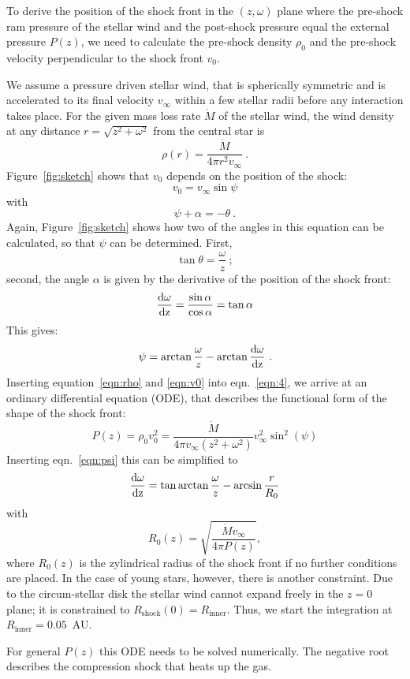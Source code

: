 To derive the position of the shock front in the $(z, \omega)$ plane where the pre-shock ram pressure of the stellar wind and the post-shock pressure equal the external pressure $P(z)$, we need to calculate the pre-shock density $\rho_0$ and the pre-shock velocity perpendicular to the shock front $v_0$.

We assume a pressure driven stellar wind, that is spherically symmetric and is accelerated to its final velocity $v_{\infty}$ within a few stellar radii before any interaction takes place. For the given mass loss rate $\dot M$ of the stellar wind, the wind density at any distance $r=\sqrt{z^2+\omega^2}$ from the central star is 
\begin{equation}\label{eqn:rho}
\rho(r) = \frac{\dot M}{4 \pi r^2 v_{\infty}}\ .
\end{equation}
Figure~\ref{fig:sketch} shows that $v_0$ depends on the position of the shock:
\begin{equation}
\label{eqn:v0}v_0 = v_{\infty} \sin \psi
\end{equation}
with 
\begin{equation}\label{eqn:angle}
\psi+\alpha = - \theta \ .
\end{equation}
Again, Figure~\ref{fig:sketch} shows how two of the angles in this equation can be calculated, so that $\psi$ can be determined. First,
\begin{equation}\label{eqn:theta}
\tan\theta = \frac{\omega}{z}\ ;
\end{equation}
second, the angle $\alpha$ is given by the derivative of the position of the shock front:
\begin{equation}\label{eqn:deriv}
\frac{\rm{d}\omega}{\rm{d}z} = \frac{\sin \alpha}{\cos \alpha} = \tan{\alpha}
\end{equation}
This gives:
\begin{equation}\label{eqn:psi}
\psi = \arctan{\frac{\omega}{z}} - \arctan{\frac{\rm{d}\omega}{\rm{d}z}}\ .
\end{equation}
Inserting equation~\ref{eqn:rho} and \ref{eqn:v0} into eqn.~\ref{eqn:4}, we arrive at an ordinary differential equation (ODE), that describes the functional form of the shape of the shock front:
\begin{equation}
P(z) = \rho_0v_0^2 = \frac{\dot{M}}{4\pi v_{\infty}(z^2+\omega^2)} v_{\infty}^2 \sin^2(\psi)
\end{equation}
Inserting eqn.~\ref{eqn:psi} this can be simplified to
\begin{equation}\label{eqn:ode}
\frac{\rm{d}\omega}{\rm{d}z} = \tan{\arctan{\frac{\omega}{z}}-\arcsin{\frac{r}{R_0}}}
\end{equation}
with
\begin{equation}
R_0(z) = \sqrt{\frac{\dot{M} v_{\infty}}{4\pi P(z)}},
\end{equation}
where $R_0(z)$ is the zylindrical radius of the shock front if no further conditions are placed. In the case of young stars, however, there is another constraint. Due to the circum-stellar disk the stellar wind cannot expand freely in the $z=0$ plane; it is constrained to $R_{\textrm{shock}}(0) = R_{\textrm{inner}}$. Thus, we start the integration at $R_{\textrm{inner}} = 0.05$~AU.

For general $P(z)$ this ODE needs to be solved numerically. The negative root describes the compression shock that heats up the gas.